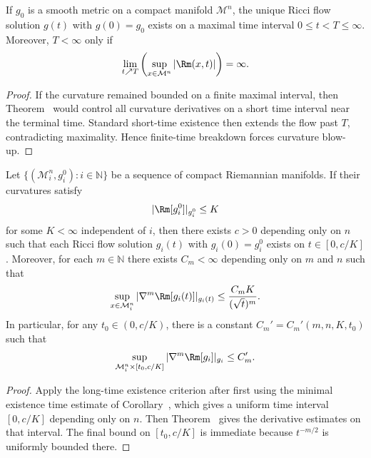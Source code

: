 \begin{corollary}
\label{ch07-cor-long-time-existence}
If \(g_0\) is a smooth metric on a compact manifold \(\mathcal M^n\), the unique Ricci flow solution \(g(t)\) with \(g(0)=g_0\) exists on a maximal time interval \(0\le t<T\le \infty\). Moreover, \(T<\infty\) only if
\[
\lim_{t\nearrow T}\left(\sup_{x\in \mathcal M^n}|\Rm(x,t)|\right)=\infty.
\]
\end{corollary}

\begin{proof}
\sketch If the curvature remained bounded on a finite maximal interval, then Theorem~ would control all curvature derivatives on a short time interval near the terminal time. Standard short-time existence then extends the flow past \(T\), contradicting maximality. Hence finite-time breakdown forces curvature blow-up.
\end{proof}

\begin{corollary}
\label{ch07-cor-uniform-bounds-sequences}
Let \(\{(\mathcal M_i^n,g_i^0):i\in\mathbb N\}\) be a sequence of compact Riemannian manifolds. If their curvatures satisfy
\[
|\Rm[g_i^0]|_{g_i^0}\le K
\]
for some \(K<\infty\) independent of \(i\), then there exists \(c>0\) depending only on \(n\) such that each Ricci flow solution \(g_i(t)\) with \(g_i(0)=g_i^0\) exists on \(t\in[0,c/K]\). Moreover, for each \(m\in\mathbb N\) there exists \(C_m<\infty\) depending only on \(m\) and \(n\) such that
\[
\sup_{x\in \mathcal M_i^n}|\nabla^m\Rm[g_i(t)]|_{g_i(t)}\le \frac{C_mK}{(\sqrt t)^m}.
\]
In particular, for any \(t_0\in(0,c/K)\), there is a constant \(C_m'=C_m'(m,n,K,t_0)\) such that
\[
\sup_{\mathcal M_i^n\times[t_0,c/K]}|\nabla^m\Rm[g_i]|_{g_i}\le C_m'.
\]
\end{corollary}

\begin{proof}
\sketch Apply the long-time existence criterion after first using the minimal existence time estimate of Corollary~, which gives a uniform time interval \([0,c/K]\) depending only on \(n\). Then Theorem~ gives the derivative estimates on that interval. The final bound on \([t_0,c/K]\) is immediate because \(t^{-m/2}\) is uniformly bounded there.
\end{proof}

